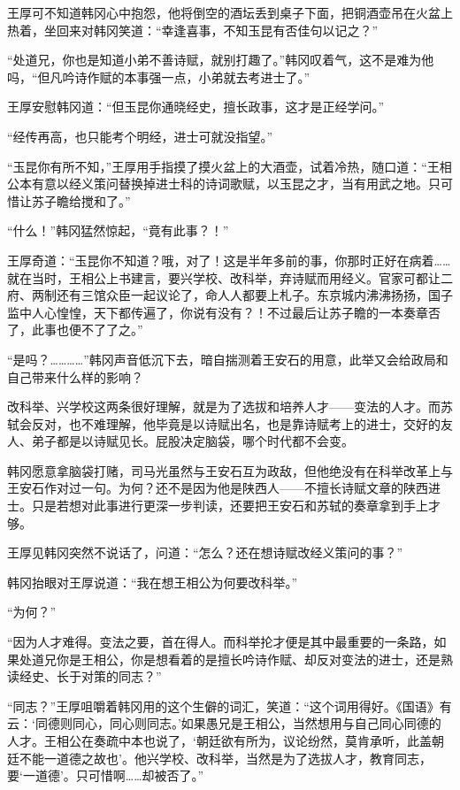 王厚可不知道韩冈心中抱怨，他将倒空的酒坛丢到桌子下面，把铜酒壶吊在火盆上热着，坐回来对韩冈笑道：“幸逢喜事，不知玉昆有否佳句以记之？”

“处道兄，你也是知道小弟不善诗赋，就别打趣了。”韩冈叹着气，这不是难为他吗，“但凡吟诗作赋的本事强一点，小弟就去考进士了。”

王厚安慰韩冈道：“但玉昆你通晓经史，擅长政事，这才是正经学问。”

“经传再高，也只能考个明经，进士可就没指望。”

“玉昆你有所不知，”王厚用手指摸了摸火盆上的大酒壶，试着冷热，随口道：“王相公本有意以经义策问替换掉进士科的诗词歌赋，以玉昆之才，当有用武之地。只可惜让苏子瞻给搅和了。”

“什么！”韩冈猛然惊起，“竟有此事？！”

王厚奇道：“玉昆你不知道？哦，对了！这是半年多前的事，你那时正好在病着……就在当时，王相公上书建言，要兴学校、改科举，弃诗赋而用经义。官家可都让二府、两制还有三馆众臣一起议论了，命人人都要上札子。东京城内沸沸扬扬，国子监中人心惶惶，天下都传遍了，你说有没有？！不过最后让苏子瞻的一本奏章否了，此事也便不了了之。”

“是吗？…………”韩冈声音低沉下去，暗自揣测着王安石的用意，此举又会给政局和自己带来什么样的影响？

改科举、兴学校这两条很好理解，就是为了选拔和培养人才——变法的人才。而苏轼会反对，也不难理解，他毕竟是以诗赋出名，也是靠诗赋考上的进士，交好的友人、弟子都是以诗赋见长。屁股决定脑袋，哪个时代都不会变。

韩冈愿意拿脑袋打赌，司马光虽然与王安石互为政敌，但他绝没有在科举改革上与王安石作对过一句。为何？还不是因为他是陕西人——不擅长诗赋文章的陕西进士。只是若想对此事进行更深一步判读，还要把王安石和苏轼的奏章拿到手上才够。

王厚见韩冈突然不说话了，问道：“怎么？还在想诗赋改经义策问的事？”

韩冈抬眼对王厚说道：“我在想王相公为何要改科举。”

“为何？”

“因为人才难得。变法之要，首在得人。而科举抡才便是其中最重要的一条路，如果处道兄你是王相公，你是想看着的是擅长吟诗作赋、却反对变法的进士，还是熟读经史、长于对策的同志？”

“同志？”王厚咀嚼着韩冈用的这个生僻的词汇，笑道：“这个词用得好。《国语》有云：‘同德则同心，同心则同志。’如果愚兄是王相公，当然想用与自己同心同德的人才。王相公在奏疏中本也说了，‘朝廷欲有所为，议论纷然，莫肯承听，此盖朝廷不能一道德之故也’。他兴学校、改科举，当然是为了选拔人才，教育同志，要‘一道德’。只可惜啊……却被否了。”

